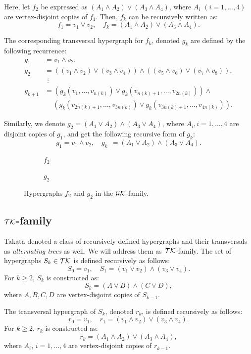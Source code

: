 Here, let $f_2$ be expressed as $(A_1\wedge A_2)\vee(A_3\wedge A_4)$, where $A_i$ $(i=1,\dots,4)$ are vertex-disjoint copies of $f_1$. Then, $f_k$ can be recursively written as:
\[
f_1=v_1\vee v_2,\quad f_k=(A_1\wedge A_2)\vee(A_3\wedge A_4).
\]

The corresponding transversal hypergraph for $f_k$, denoted $g_k$ are defined by the following recurrence:
\begin{align*}
g_1&=v_1\wedge v_2,\\
g_2&=((v_1\wedge v_2)\vee(v_3\wedge v_4))\wedge((v_5\wedge v_6)\vee(v_7\wedge v_8)),\\
&\ \,\vdots\\
g_{k+1}&=(g_k(v_1,\dots,v_{n(k)})\vee g_k(v_{n(k)+1},\dots,v_{2n(k)}))\wedge\\
&\quad\ (g_k(v_{2n(k)+1},\dots,v_{3n(k)})\vee g_k(v_{3n(k)+1},\dots,v_{4n(k)})).
\end{align*}

Similarly, we denote $g_2=(A_1\vee A_2)\wedge(A_3\vee A_4)$, where $A_i,i=1,\dots,4$ are disjoint copies of $g_1$, and get the following recursive form of $g_k$:
\[
g_1=v_1\wedge v_2,\quad g_k\ \ =(A_1\vee A_2)\wedge(A_3\vee A_4).
\]

\begin{figure}[h]
\centering
\begin{subfigure}{0.42\linewidth}\centering\caption{$f_2$}\end{subfigure}\hfill
\begin{subfigure}{0.5\linewidth}\centering\caption{$g_2$}\end{subfigure}
\caption{Hypergraphs $f_2$ and $g_2$ in the $\mathcal{GK}$-family.}
\end{figure}

\subsection{$\mathcal{TK}$-family}

Takata denoted a class of recursively defined hypergraphs and their transversals as \emph{alternating trees} as well. We will address them as $\mathcal{TK}$-family. The set of hypergraphs $S_k\in\mathcal{TK}$ is defined recursively as follows:
\[
S_0=v_1,\quad S_1=(v_1\vee v_2)\wedge(v_3\vee v_4).
\]
For $k\geq 2$, $S_k$ is constructed as:
\[
S_k=(A\vee B)\wedge(C\vee D),
\]
where $A,B,C,D$ are vertex-disjoint copies of $S_{k-1}$.

The transversal hypergraph of $S_k$, denoted $r_k$, is defined recursively as follows:
\[
r_0=v_1,\quad r_1=(v_1\wedge v_2)\vee(v_3\wedge v_4).
\]
For $k\geq 2$, $r_k$ is constructed as:
\[
r_k=(A_1\wedge A_2)\vee(A_3\wedge A_4),
\]
where $A_i$, $i=1,\dots,4$ are vertex-disjoint copies of $r_{k-1}$.

